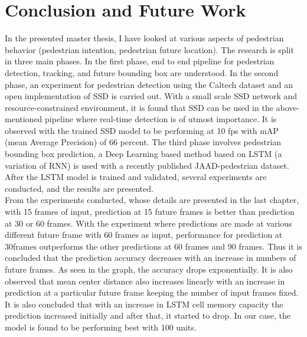 
\chapter{Conclusion and Future Work}
In the presented master thesis, I have looked at various aspects of pedestrian behavior (pedestrian intention, pedestrian future location). The research is split in three main phases. In the first phase, end to end pipeline for pedestrian detection, tracking, and future bounding box are understood. In the second phase, an experiment for pedestrian detection using the Caltech dataset and an open implementation of SSD is carried out. With a small scale SSD network and resource-constrained environment, it is found that SSD can be used in the above-mentioned pipeline where real-time detection is of utmost importance. It is observed with the trained SSD model to be performing at 10  fps with mAP (mean Average Precision) of 66 percent. The third phase involves pedestrian bounding box prediction, a Deep Learning  based method based on LSTM (a variation of RNN) is used with a recently published JAAD-pedestrian dataset. After the LSTM model is trained and validated, several experiments are conducted, and the results are presented. \\

From the experiments conducted, whose details are presented in the last chapter, with 15 frames of input, prediction at 15 future frames is better than prediction at 30 or 60 frames. With the experiment where predictions are made at various different future frame with 60 frames as input, performance for prediction at 30frames outperforms the other predictions at 60 frames and 90 frames. Thus it is concluded that the prediction accuracy decreases with an increase in numbers of future frames. As seen in the graph, the accuracy drops exponentially. It is also observed that mean center distance also increases linearly with an increase in prediction at a particular future frame keeping the number of input frames fixed. \\

It is also concluded that with an increase in LSTM cell memory capacity the prediction increased initially and after that, it started to drop. In our case, the model is found to be performing best with 100 units. \\

